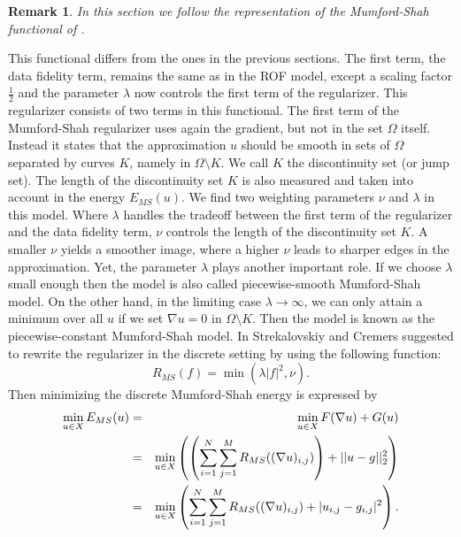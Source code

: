 \documentclass[abstracton]{scrreprt}
\newtheorem{remark}[theorem]{Remark}
\begin{document}
        \begin{remark}
            In this section we follow the representation of the Mumford-Shah functional of \cite{Strekalovskiy-Cremers-eccv14}.
        \end{remark}
        This functional differs from the ones in the previous sections. The first term, the data fidelity term, remains the same as in the ROF model, except a scaling factor $\frac{1}{2}$ and the parameter $\lambda$ now controls the first term of the regularizer. This regularizer consists of two terms in this functional. The first term of the Mumford-Shah regularizer uses again the gradient, but not in the set $\Omega$ itself. Instead it states that the approximation $u$ should be smooth in sets of $\Omega$ separated by curves $K$, namely in $\Omega \setminus K$. We call $K$ the discontinuity set (or jump set). The length of the discontinuity set $K$ is also measured and taken into account in the energy $E_{MS}(u)$. We find two weighting parameters $\nu$ and $\lambda$ in this model. Where $\lambda$ handles the tradeoff between the first term of the regularizer and the data fidelity term, $\nu$ controls the length of the discontinuity set $K$. A smaller $\nu$ yields a smoother image, where a higher $\nu$ leads to sharper edges in the approximation. Yet, the parameter $\lambda$ plays another important role. If we choose $\lambda$ small enough then the model is also called piecewise-smooth Mumford-Shah model. On the other hand, in the limiting case $\lambda \to \infty$, we can only attain a minimum over all $u$ if we set $\nabla u = 0$ in $\Omega \setminus K$. Then the model is known as the piecewise-constant Mumford-Shah model. In \cite{Strekalovskiy-Cremers-eccv14} Strekalovskiy and Cremers suggested to rewrite the regularizer in the discrete setting by using the following function:
            \begin{equation}
                R_{MS}(f) = \min(\lambda |f|^{2},\nu).
            \label{eq:ms_regularizer}
            \end{equation}
        Then minimizing the discrete Mumford-Shah energy is expressed by
            \begin{eqnarray}
                \min_{u \in X} E_{MS}(u) &=& \min_{u \in X} F(\nabla u) + G(u) \notag \\
                &=& \min_{u \in X} \left( \left(\sum_{i = 1}^{N} \sum_{j = 1}^{M} R_{MS}((\nabla u)_{i,j}) \right) + ||u - g||_{2}^{2} \right) \notag \\
                &=& \min_{u \in X} \left(\sum_{i = 1}^{N} \sum_{j = 1}^{M} R_{MS}((\nabla u)_{i,j}) + |u_{i,j} - g_{i,j}|^{2} \right).
            \end{eqnarray}
\end{document}

